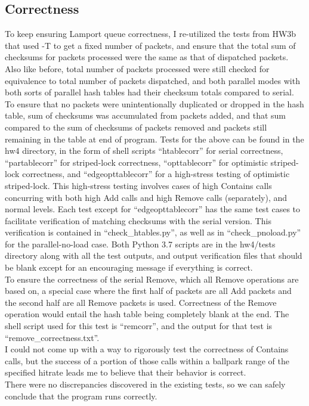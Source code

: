 \documentclass{article}
\begin{document}
\begin{adjustwidth}{-2cm}{-2cm}
\subsection{Correctness}
To keep ensuring Lamport queue correctness, I re-utilized the tests from HW3b that used -T to get a fixed number of packets, and ensure that the total sum of checksums for packets processed were the same as that of dispatched packets. Also like before, total number of packets processed were still checked for equivalence to total number of packets dispatched, and both parallel modes with both sorts of parallel hash tables had their checksum totals compared to serial.\\
To ensure that no packets were unintentionally duplicated or dropped in the hash table, sum of checksums was accumulated from packets added, and that sum compared to the sum of checksums of packets removed and packets still remaining in the table at end of program. 
Tests for the above can be found in the hw4 directory, in the form of shell scripts ``htablecorr'' for serial correctness, ``partablecorr'' for striped-lock correctness, ``opttablecorr'' for optimistic striped-lock correctness, and ``edgeopttablecorr'' for a high-stress testing of optimistic striped-lock. This high-stress testing involves cases of high Contains calls concurring with both high Add calls and high Remove calls (separately), and normal levels. Each test except for ``edgeopttablecorr'' has the same test cases to facilitate verification of matching checksums with the serial version. This verification is contained in ``check\_htables.py'', as well as in ``check\_pnoload.py'' for the parallel-no-load case. Both Python 3.7 scripts are in the hw4/tests directory along with all the test outputs, and output verification files that should be blank except for an encouraging message if everything is correct.\\
To ensure the correctness of the serial Remove, which all Remove operations are based on, a special case where the first half of packets are all Add packets and the second half are all Remove packets is used. Correctness of the Remove operation would entail the hash table being completely blank at the end. The shell script used for this test is ``remcorr'', and the output for that test is ``remove\_correctness.txt''.\\
I could not come up with a way to rigorously test the correctness of Contains calls, but the success of a portion of those calls within a ballpark range of the specified hitrate leads me to believe that their behavior is correct.\\
There were no discrepancies discovered in the existing tests, so we can safely conclude that the program runs correctly.


\end{adjustwidth}
\end{document}
